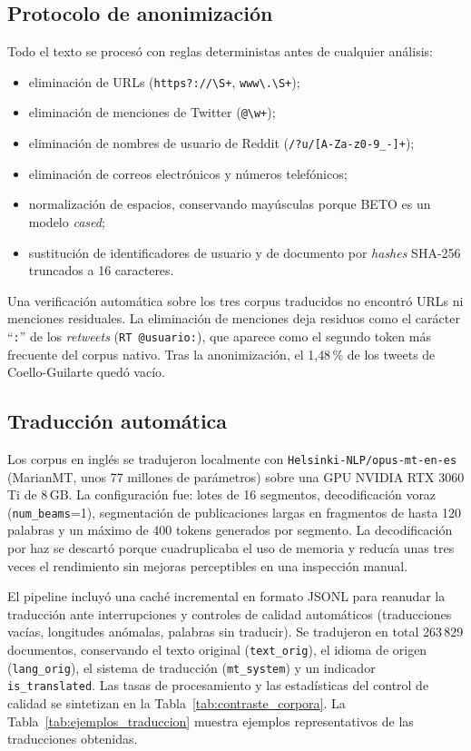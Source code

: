 \documentclass[12pt,a4paper]{article}
\begin{document}
\subsection{Protocolo de anonimización}
\label{sec:anonimizacion}
Todo el texto se procesó con reglas deterministas antes de cualquier análisis:
\begin{itemize}[leftmargin=2em]
    \item eliminación de URLs (\verb|https?://\S+|, \verb|www\.\S+|);
    \item eliminación de menciones de Twitter (\verb|@\w+|);
    \item eliminación de nombres de usuario de Reddit (\verb|/?u/[A-Za-z0-9_-]+|);
    \item eliminación de correos electrónicos y números telefónicos;
    \item normalización de espacios, conservando mayúsculas porque BETO es un modelo \emph{cased};
    \item sustitución de identificadores de usuario y de documento por \emph{hashes} SHA-256 truncados a 16 caracteres.
\end{itemize}
Una verificación automática sobre los tres corpus traducidos no encontró URLs ni menciones residuales. La eliminación de menciones deja residuos como el carácter ``\texttt{:}'' de los \emph{retweets} (\texttt{RT @usuario:}), que aparece como el segundo token más frecuente del corpus nativo. Tras la anonimización, el 1{,}48\,\% de los tweets de Coello-Guilarte quedó vacío.

\subsection{Traducción automática}
\label{sec:traduccion}
Los corpus en inglés se tradujeron localmente con \texttt{Helsinki-NLP/opus-mt-en-es} (MarianMT, unos 77 millones de parámetros) sobre una GPU NVIDIA RTX 3060 Ti de 8\,GB. La configuración fue: lotes de 16 segmentos, decodificación voraz (\texttt{num\_beams}=1), segmentación de publicaciones largas en fragmentos de hasta 120 palabras y un máximo de 400 tokens generados por segmento. La decodificación por haz se descartó porque cuadruplicaba el uso de memoria y reducía unas tres veces el rendimiento sin mejoras perceptibles en una inspección manual.

El pipeline incluyó una caché incremental en formato JSONL para reanudar la traducción ante interrupciones y controles de calidad automáticos (traducciones vacías, longitudes anómalas, palabras sin traducir). Se tradujeron en total 263\,829 documentos, conservando el texto original (\texttt{text\_orig}), el idioma de origen (\texttt{lang\_orig}), el sistema de traducción (\texttt{mt\_system}) y un indicador \texttt{is\_translated}. Las tasas de procesamiento y las estadísticas del control de calidad se sintetizan en la Tabla~\ref{tab:contraste_corpora}. La Tabla~\ref{tab:ejemplos_traduccion} muestra ejemplos representativos de las traducciones obtenidas.
\end{document}
